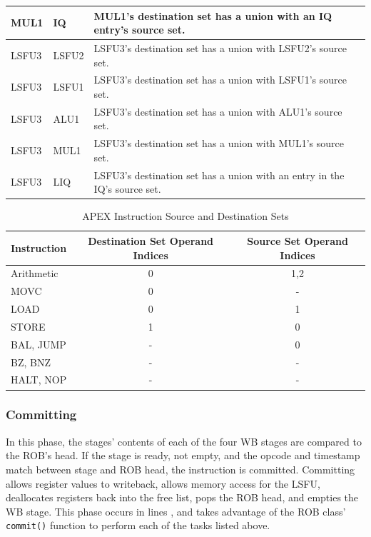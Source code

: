 \documentclass[12pt]{article}
\begin{document}
\begin{table}
\begin{tabular}{l|l|p{5.0in}}
    MUL1 & IQ & MUL1's destination set has a union with an IQ entry's source set. \\
    \hline
    LSFU3 & LSFU2 & LSFU3's destination set has a union with LSFU2's source set. \\
    LSFU3 & LSFU1 & LSFU3's destination set has a union with LSFU1's source set. \\
    LSFU3 & ALU1 & LSFU3's destination set has a union with ALU1's source set. \\
    LSFU3 & MUL1 & LSFU3's destination set has a union with MUL1's source set. \\
    LSFU3 & LIQ & LSFU3's destination set has a union with an entry in the IQ's source set. \\
  \end{tabular}
\end{table}

\begin{table}
  \centering
  \caption{APEX Instruction Source and Destination Sets}
  \label{tab:instsets}
  \begin{tabular}{l|c|c}
    Instruction & Destination Set Operand Indices & Source Set Operand Indices\\
    \hline
    Arithmetic					 	& 0 & 1,2\\
    MOVC 							& 0 & - \\
    LOAD							& 0 & 1 \\
    STORE							& 1 & 0 \\
    BAL, JUMP						& - & 0 \\
    BZ, BNZ 						& - & - \\
    HALT, NOP						& - & - \\
  \end{tabular}
\end{table}

\subsubsection{Committing}
In this phase, the stages' contents of each of the four WB stages are compared to the ROB's head. If the stage is ready, not empty, and the opcode and timestamp match between stage and ROB head, the instruction is committed.
Committing allows register values to writeback, allows memory access for the LSFU, deallocates registers back into the free list, pops the ROB head, and empties the WB stage.
This phase occurs in lines , and takes advantage of the ROB class' \texttt{commit()} function to perform each of the tasks listed above.
\end{document}
